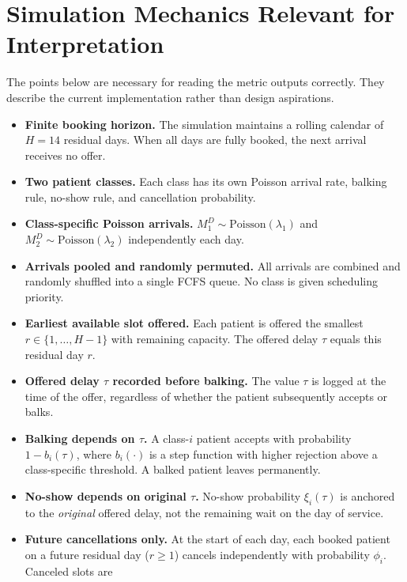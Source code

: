 \documentclass[11pt]{article}
\begin{document}
\section{Simulation Mechanics Relevant for Interpretation}

The points below are necessary for reading the metric outputs
correctly.  They describe the current implementation rather than
design aspirations.

\begin{itemize}[leftmargin=1.5em, itemsep=3pt]
  \item \textbf{Finite booking horizon.}  The simulation maintains a
    rolling calendar of $H = 14$ residual days.  When all days are
    fully booked, the next arrival receives no offer.
  \item \textbf{Two patient classes.}  Each class has its own Poisson
    arrival rate, balking rule, no-show rule, and cancellation probability.
  \item \textbf{Class-specific Poisson arrivals.}
    $M_1^D \sim \mathrm{Poisson}(\lambda_1)$ and
    $M_2^D \sim \mathrm{Poisson}(\lambda_2)$ independently each day.
  \item \textbf{Arrivals pooled and randomly permuted.}  All arrivals
    are combined and randomly shuffled into a single FCFS queue.  No
    class is given scheduling priority.
  \item \textbf{Earliest available slot offered.}  Each patient is
    offered the smallest $r \in \{1,\ldots,H-1\}$ with remaining
    capacity.  The offered delay $\tau$ equals this residual day $r$.
  \item \textbf{Offered delay $\tau$ recorded before balking.}
    The value $\tau$ is logged at the time of the offer, regardless of
    whether the patient subsequently accepts or balks.
  \item \textbf{Balking depends on $\tau$.}  A class-$i$ patient
    accepts with probability $1 - b_i(\tau)$, where $b_i(\cdot)$ is a
    step function with higher rejection above a class-specific threshold.
    A balked patient leaves permanently.
  \item \textbf{No-show depends on original $\tau$.}  No-show
    probability $\xi_i(\tau)$ is anchored to the \emph{original}
    offered delay, not the remaining wait on the day of service.
  \item \textbf{Future cancellations only.}  At the start of each day,
    each booked patient on a future residual day ($r \geq 1$) cancels
    independently with probability $\phi_i$.  Canceled slots are

\end{itemize}
\end{document}
